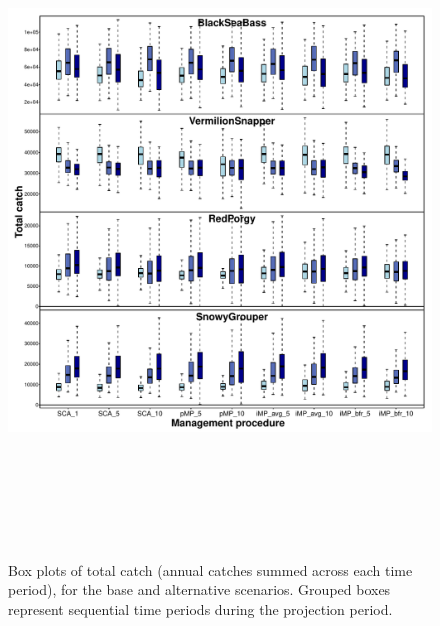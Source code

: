 \documentclass[12pt,english]{article}
\begin{document}
\begin{figure}[!ht]
\begin{center}
\includegraphics[width=6in,height=7in]{../Figs/boxplotCatchTotal1.pdf}
\end{center}
\begin{flushleft}
\caption{Box plots of total catch (annual catches summed across each time period), for the base and alternative scenarios. Grouped boxes represent sequential time periods during the projection period.}
\label{fig:boxplotCatch1}
\end{flushleft}
\end{figure}
\end{document}
